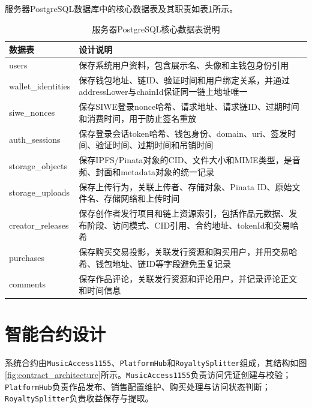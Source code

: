 服务器PostgreSQL数据库中的核心数据表及其职责如表\ref{tab:server_postgresql_tables}所示。

\begin{table}[htbp]
    \linespread{1.5}
    \songti
    \centering
    \caption{服务器PostgreSQL核心数据表说明}\label{tab:server_postgresql_tables}
    \begin{tabular}{|l|p{10cm}|}
        \hline
        数据表                & 设计说明                                                       \\ \hline
        users              & 保存系统用户资料，包含展示名、头像和主钱包身份引用                                  \\ \hline
        wallet\_identities & 保存钱包地址、链ID、验证时间和用户绑定关系，并通过addressLower与chainId保证同一链上地址唯一   \\ \hline
        siwe\_nonces       & 保存SIWE登录nonce哈希、请求地址、请求链ID、过期时间和消费时间，用于防止签名重放              \\ \hline
        auth\_sessions     & 保存登录会话token哈希、钱包身份、domain、uri、签发时间、验证时间、过期时间和吊销时间          \\ \hline
        storage\_objects   & 保存IPFS/Pinata对象的CID、文件大小和MIME类型，是音频、封面和metadata对象的统一记录     \\ \hline
        storage\_uploads   & 保存上传行为，关联上传者、存储对象、Pinata ID、原始文件名、存储网络和上传时间                \\ \hline
        creator\_releases  & 保存创作者发行项目和链上资源索引，包括作品元数据、发布阶段、访问模式、CID引用、合约地址、tokenId和交易哈希 \\ \hline
        purchases          & 保存购买交易投影，关联发行资源和购买用户，并用交易哈希、钱包地址、链ID等字段避免重复记录              \\ \hline
        comments           & 保存作品评论，关联发行资源和评论用户，并记录评论正文和时间信息                            \\ \hline
    \end{tabular}
\end{table}

\section{智能合约设计}

系统合约由\texttt{MusicAccess1155}、\texttt{PlatformHub}和\texttt{RoyaltySplitter}组成，其结构如图\ref{fig:contract_architecture}所示。\texttt{MusicAccess1155}负责访问凭证创建与校验；\texttt{PlatformHub}负责作品发布、销售配置维护、购买处理与访问状态判断；\texttt{RoyaltySplitter}负责收益保存与提取。

